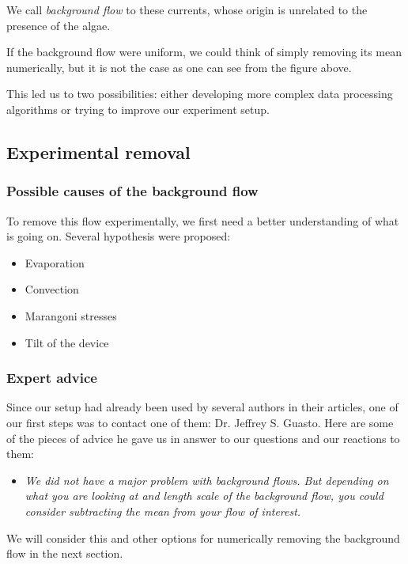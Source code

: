 We call \textit{background flow} to these currents, whose origin is unrelated to the presence of the algae.

If the background flow were uniform, we could think of simply removing its mean numerically, but it is not the case as one can see from the figure above. 

This led us to two possibilities: either developing more complex data processing algorithms or trying to improve our experiment setup. 

\subsection{Experimental removal}

\subsubsection{Possible causes of the background flow}

To remove this flow experimentally, we first need a better understanding of what is going on. Several hypothesis were proposed:

\begin{itemize}
	\item Evaporation
	\item Convection
	\item Marangoni stresses
	\item Tilt of the device
\end{itemize}

\subsubsection{Expert advice}

Since our setup had already been used by several authors in their articles, one of our first steps was to contact one of them: Dr. Jeffrey S. Guasto. Here are some of the pieces of advice he gave us in answer to our questions and our reactions to them:

\begin{itemize}
	\item \textit{We did not have a major problem with background flows. But depending on what you are looking at and length scale of the background flow, you could consider subtracting the mean from your flow of interest.}
\end{itemize}

We will consider this and other options for numerically removing the background flow in the next section.

